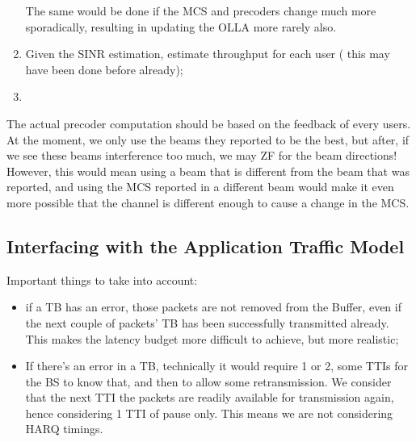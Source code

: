 \begin{enumerate}
    The same would be done if the MCS and precoders change much more sporadically, resulting in updating the  \acs{OLLA} more rarely also.
    
    

    \item Given the SINR estimation, estimate throughput for each user ( this may have been done before already);
    \item 
\end{enumerate}



The actual precoder computation should be based on the feedback of every users. At the moment, we only use the beams they reported to be the best, but after, if we see these beams interference too much, we may ZF for the beam directions! However, this would mean using a beam that is different from the beam that was reported, and using the MCS reported in a different beam would make it even more possible that the channel is different enough to cause a change in the MCS.












\subsection*{Interfacing with the Application Traffic Model}

Important things to take into account:
\begin{itemize}
    \item if a \acs{TB} has an error, those packets are not removed from the Buffer, even if the next couple of packets' \acs{TB} has been successfully transmitted already. This makes the latency budget more difficult to achieve, but more realistic;
    \item If there's an error in a \acs{TB}, technically it would require 1 or 2, some TTIs for the \acs{BS} to know that, and then to allow some retransmission. We consider that the next TTI the packets are readily available for transmission again, hence considering 1 TTI of pause only. This means we are not considering HARQ timings.
\end{itemize}






